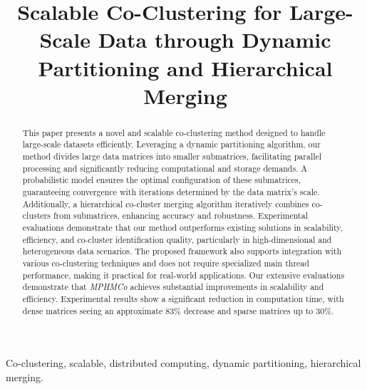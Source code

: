 \documentclass[journal]{IEEEtran}
\begin{document}
\title{\LARGE \bf Scalable Co-Clustering for Large-Scale Data through Dynamic Partitioning and Hierarchical Merging}


\author{}
\maketitle

\begin{abstract}
  This paper presents a novel and scalable co-clustering method designed to handle large-scale datasets efficiently. Leveraging a dynamic partitioning algorithm, our method divides large data matrices into smaller submatrices, facilitating parallel processing and significantly reducing computational and storage demands. A probabilistic model ensures the optimal configuration of these submatrices, guaranteeing convergence with iterations determined by the data matrix's scale. Additionally, a hierarchical co-cluster merging algorithm iteratively combines co-clusters from submatrices, enhancing accuracy and robustness. Experimental evaluations demonstrate that our method outperforms existing solutions in scalability, efficiency, and co-cluster identification quality, particularly in high-dimensional and heterogeneous data scenarios. The proposed framework also supports integration with various co-clustering techniques and does not require specialized main thread performance, making it practical for real-world applications. Our extensive evaluations demonstrate that \emph{MPHMCo} achieves substantial improvements in scalability and efficiency. Experimental results show a significant reduction in computation time, with dense matrices seeing an approximate 83\% decrease and sparse matrices up to 30\%.
\end{abstract}

\begin{IEEEkeywords}
  Co-clustering, scalable, distributed computing, dynamic partitioning, hierarchical merging.
\end{IEEEkeywords}
\end{document}
